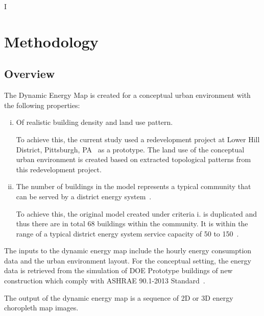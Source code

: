 I %

\chapter{Methodology} %

\label{Chapter4} %


\section{Overview}
The Dynamic Energy Map is created for a conceptual urban environment
with the following properties:
\begin{enumerate}[i.]
\item Of realistic building density and land use pattern.
  
  To achieve this, the current study used a redevelopment project at
  Lower Hill District, Pittsburgh, PA~\cite{Ramesh2013} as a
  prototype.  The land use of the conceptual urban environment is
  created based on extracted topological patterns from this
  redevelopment project.

\item The number of buildings in the model represents a typical
  community that can be served by a district energy
  system~\cite{IDEA2012}.
  
  To achieve this, the original model created under criteria i. is
  duplicated and thus there are in total 68 buildings within the
  community. It is within the range of a typical district energy
  system service capacity of 50 to 150~\cite{IDEA2012}.

\end{enumerate}

The inputs to the dynamic energy map include the hourly energy
consumption data and the urban environment layout. For the conceptual
setting, the energy data is retrieved from the simulation of DOE
Prototype buildings of new construction which comply with ASHRAE
90.1-2013 Standard~\cite{DOEprototype}.

The output of the dynamic energy map is a sequence of 2D or 3D energy
choropleth map images.

